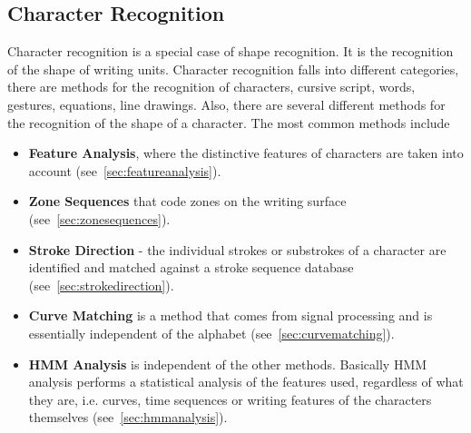 \subsection{Character Recognition}
\label{sec:characterrecognition}


Character recognition is a special case of shape recognition. It is the 
recognition of the shape of writing units. Character recognition falls into
different categories, there are methods for the recognition of characters,
cursive script, words, gestures, equations, line drawings. Also, there are 
several different methods for the recognition of the shape of a character.
The most common methods include 
\begin{itemize}
  \item \textbf{Feature Analysis}, where the distinctive features of characters 
    are taken into account (see~\ref{sec:featureanalysis}).
  \item \textbf{Zone Sequences} that code zones on the writing surface
    (see~\ref{sec:zonesequences}).
  \item \textbf{Stroke Direction} - the individual strokes or substrokes of a
    character are identified and matched against a stroke sequence database
    (see~\ref{sec:strokedirection}).
  \item \textbf{Curve Matching} is a method that comes from signal processing
    and is essentially independent of the alphabet (see~\ref{sec:curvematching}).
  \item \textbf{HMM Analysis} is independent of the other methods. Basically HMM
    analysis performs a statistical analysis of the features used, 
    regardless of what they are, i.e. curves, time sequences or writing features
    of the characters themselves (see~\ref{sec:hmmanalysis}).
\end{itemize}

